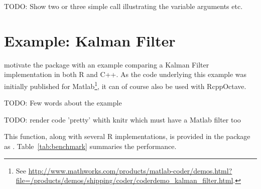 TODO: Show two or three simple call illustrating the variable arguments etc.

\section{Example: Kalman Filter}

\cite{Eddelbuettel+Sanderson:2012} motivate the  package
with an example comparing a Kalman Filter implementation in both R and
C++. As the code underlying this example was initially published for
Matlab\footnote{See
  \url{http://www.mathworks.com/products/matlab-coder/demos.html?file=/products/demos/shipping/coder/coderdemo_kalman_filter.html}.},
it can of course also be used with RcppOctave.

TODO: Few words about the example

TODO: render code 'pretty' whith knitr which must have a Matlab filter too



This function, along with several R implementations, is provided in the
 package as . %
Table~\ref{tab:benchmark} summaries the performance.


